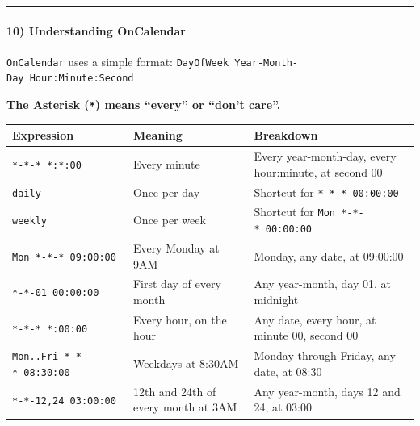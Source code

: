 \documentclass[
  english,
  paper=a4,
  oneside  ,captions=tableheading
]{scrartcl}
\newcounter{none} %
\begin{document}
\begin{center}\rule{0.5\linewidth}{0.5pt}\end{center}

\paragraph{10) Understanding OnCalendar}\label{understanding-oncalendar}

\texttt{OnCalendar} uses a simple format:
\texttt{DayOfWeek\ Year-Month-Day\ Hour:Minute:Second}

\textbf{The Asterisk (\texttt{*}) means ``every'' or ``don't care''.}

{\def\LTcaptype{none} %
\begin{longtable}[]{@{}
  >{\raggedright\arraybackslash}p{}
  >{\raggedright\arraybackslash}p{}
  >{\raggedright\arraybackslash}p{}@{}}
\toprule\noalign{}
\begin{minipage}[b]{\linewidth}\raggedright
Expression
\end{minipage} & \begin{minipage}[b]{\linewidth}\raggedright
Meaning
\end{minipage} & \begin{minipage}[b]{\linewidth}\raggedright
Breakdown
\end{minipage} \\
\midrule\noalign{}
\endhead
\bottomrule\noalign{}
\endlastfoot
\texttt{*-*-*\ *:*:00} & Every minute & Every year-month-day, every
hour:minute, at second 00 \\
\texttt{daily} & Once per day & Shortcut for \texttt{*-*-*\ 00:00:00} \\
\texttt{weekly} & Once per week & Shortcut for
\texttt{Mon\ *-*-*\ 00:00:00} \\
\texttt{Mon\ *-*-*\ 09:00:00} & Every Monday at 9AM & Monday, any date,
at 09:00:00 \\
\texttt{*-*-01\ 00:00:00} & First day of every month & Any year-month,
day 01, at midnight \\
\texttt{*-*-*\ *:00:00} & Every hour, on the hour & Any date, every
hour, at minute 00, second 00 \\
\texttt{Mon..Fri\ *-*-*\ 08:30:00} & Weekdays at 8:30AM & Monday through
Friday, any date, at 08:30 \\
\texttt{*-*-12,24\ 03:00:00} & 12th and 24th of every month at 3AM & Any
year-month, days 12 and 24, at 03:00 \\
\end{longtable}
}
\end{document}

